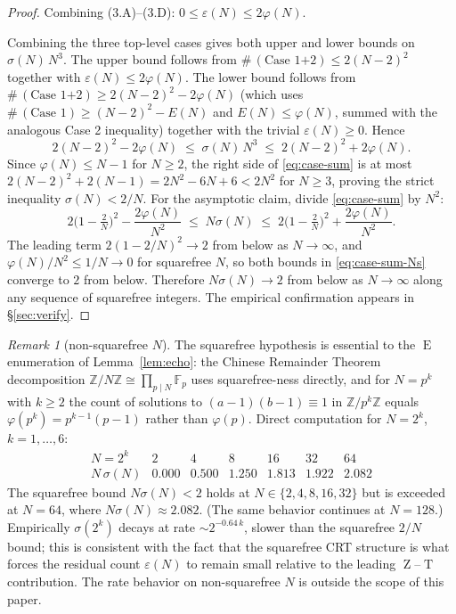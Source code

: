 \documentclass[11pt,reqno]{amsart}
\theoremstyle{plain}
\theoremstyle{definition}
\theoremstyle{remark}
\newtheorem*{remark}{Remark}
\DeclareMathOperator{\ECHO}{E}
\DeclareMathOperator{\HARM}{T}
\DeclareMathOperator{\VOID}{Z}
\newcommand{\ZN}{\mathbb{Z}/N\mathbb{Z}}
\newcommand{\Z}{\mathbb{Z}}
\begin{document}
\begin{proof}
\smallskip\noindent
Combining (3.A)--(3.D): $0\le\varepsilon(N)\le 2\varphi(N)$.

\medskip
Combining the three top-level cases gives both upper and lower
bounds on $\sigma(N)\,N^{3}$. The upper bound follows from
$\#\,(\text{Case 1+2}) \le 2(N-2)^{2}$ together with
$\varepsilon(N)\le 2\varphi(N)$. The lower bound follows from
$\#\,(\text{Case 1+2}) \ge 2(N-2)^{2} - 2\varphi(N)$
(which uses $\#\,(\text{Case 1}) \ge (N-2)^{2} - E(N)$ and
$E(N)\le \varphi(N)$, summed with the analogous Case 2 inequality)
together with the trivial $\varepsilon(N)\ge 0$. Hence
\begin{equation}\label{eq:case-sum}
  2(N-2)^{2}-2\varphi(N)\;\le\;\sigma(N)\,N^{3}\;\le\;2(N-2)^{2}+2\varphi(N).
\end{equation}
Since $\varphi(N)\le N-1$ for $N\ge 2$, the right side of
\eqref{eq:case-sum} is at most
$2(N-2)^{2}+2(N-1)=2N^{2}-6N+6<2N^{2}$ for $N\ge 3$, proving the
strict inequality $\sigma(N)<2/N$. For the asymptotic claim, divide
\eqref{eq:case-sum} by $N^{2}$:
\begin{equation}\label{eq:case-sum-Ns}
  2\bigl(1-\tfrac{2}{N}\bigr)^{2}-\frac{2\varphi(N)}{N^{2}}
  \;\le\;N\sigma(N)\;\le\;
  2\bigl(1-\tfrac{2}{N}\bigr)^{2}+\frac{2\varphi(N)}{N^{2}}.
\end{equation}
The leading term $2(1-2/N)^{2}\to 2$ from below as $N\to\infty$, and
$\varphi(N)/N^{2}\le 1/N\to 0$ for squarefree $N$, so both bounds in
\eqref{eq:case-sum-Ns} converge to $2$ from below. Therefore
$N\sigma(N)\to 2$ from below as $N\to\infty$ along any sequence of
squarefree integers. The empirical confirmation appears in
\S\ref{sec:verify}.
\end{proof}

\begin{remark}[non-squarefree $N$]
The squarefree hypothesis is essential to the $\ECHO$ enumeration of
Lemma~\ref{lem:echo}: the Chinese Remainder Theorem decomposition
$\ZN\cong\prod_{p\mid N}\mathbb F_{p}$ uses squarefree-ness directly,
and for $N=p^{k}$ with $k\ge 2$ the count of solutions to
$(a-1)(b-1)\equiv 1$ in $\Z/p^{k}\Z$ equals $\varphi(p^{k})=p^{k-1}(p-1)$
rather than $\varphi(p)$. Direct computation for $N=2^{k}$, $k=1,\ldots,6$:
\[
\begin{array}{c|cccccc}
N=2^{k}      & 2     & 4     & 8     & 16    & 32    & 64 \\
\hline
N\,\sigma(N) & 0.000 & 0.500 & 1.250 & 1.813 & 1.922 & 2.082
\end{array}
\]
The squarefree bound $N\sigma(N) < 2$ holds at $N \in \{2, 4, 8, 16, 32\}$
but is exceeded at $N = 64$, where $N\sigma(N) \approx 2.082$. (The same
behavior continues at $N = 128$.) Empirically $\sigma(2^{k})$ decays at
rate $\sim 2^{-0.64\,k}$, slower than the squarefree $2/N$ bound; this
is consistent with the fact that the squarefree CRT structure is what
forces the residual count $\varepsilon(N)$ to remain small relative
to the leading $\VOID$--$\HARM$ contribution. The rate behavior on
non-squarefree $N$ is outside the scope of this paper.
\end{remark}
\end{document}
